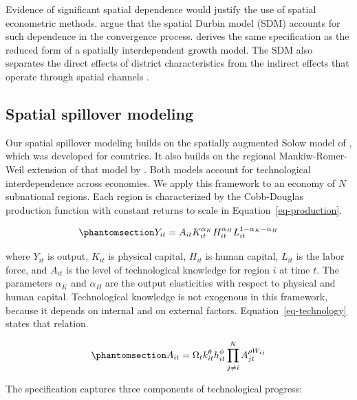 \documentclass[
  a4paper, 
  twoside,
  final
]{article}
\begin{document}
Evidence of significant spatial dependence would justify the use of
spatial econometric methods. \citet{ertur_koch_spatial_growth} argue
that the spatial Durbin model (SDM) accounts for such dependence in the
convergence process. \citet{fischer_spatial_mrw} derives the same
specification as the reduced form of a spatially interdependent growth
model. The SDM also separates the direct effects of district
characteristics from the indirect effects that operate through spatial
channels \citep{lesage_pace_spatial_econometrics}.

\subsection{Spatial spillover
modeling}\label{spatial-spillover-modeling}

Our spatial spillover modeling builds on the spatially augmented Solow
model of \citet{ertur_koch_spatial_growth}, which was developed for
countries. It also builds on the regional Mankiw-Romer-Weil extension of
that model by \citet{fischer_spatial_mrw}. Both models account for
technological interdependence across economies. We apply this framework
to an economy of \(N\) subnational regions. Each region is characterized
by the Cobb-Douglas production function with constant returns to scale
in Equation~\ref{eq-production}.

\begin{equation}\phantomsection\label{eq-production}{
Y_{i t}=A_{i t} K_{i t}^{\alpha_{K}} H_{i t}^{\alpha_{H}} L_{i t}^{1-\alpha_{K} -\alpha_{H}}
}\end{equation}

where \(Y_{it}\) is output, \(K_{it}\) is physical capital, \(H_{it}\)
is human capital, \(L_{it}\) is the labor force, and \(A_{it}\) is the
level of technological knowledge for region \(i\) at time \(t\). The
parameters \(\alpha_K\) and \(\alpha_H\) are the output elasticities
with respect to physical and human capital. Technological knowledge is
not exogenous in this framework, because it depends on internal and on
external factors. Equation~\ref{eq-technology} states that relation.

\begin{equation}\phantomsection\label{eq-technology}{
A_{i t}=\Omega_{t} k_{i t}^{\theta} h_{i t}^{\phi} \prod_{j \neq i}^{N} A_{j t}^{\rho W_{i j}}
}\end{equation}

The specification captures three components of technological progress:
\end{document}
